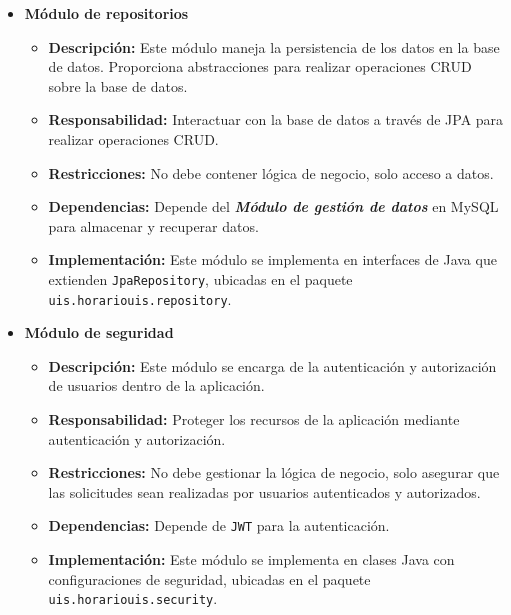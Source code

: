 \documentclass{article} %
\begin{document}
\begin{itemize}
\begin{itemize}
            \item \textbf{Módulo de repositorios}
            \begin{itemize}
                \item \textbf{Descripción:} Este módulo maneja la persistencia de los datos en la base de datos. Proporciona abstracciones para realizar operaciones CRUD sobre la base de datos.
                \item \textbf{Responsabilidad:} Interactuar con la base de datos a través de JPA para realizar operaciones CRUD.
                \item \textbf{Restricciones:} No debe contener lógica de negocio, solo acceso a datos.
                \item \textbf{Dependencias:} Depende del \textbf{\emph{Módulo de gestión de datos}} en MySQL para almacenar y recuperar datos.
                \item \textbf{Implementación:} Este módulo se implementa en interfaces de Java que extienden \texttt{JpaRepository}, ubicadas en el paquete \texttt{uis.horariouis.repository}.
            \end{itemize}
            
            \item \textbf{Módulo de seguridad}
            \begin{itemize}
                \item \textbf{Descripción:} Este módulo se encarga de la autenticación y autorización de usuarios dentro de la aplicación.
                \item \textbf{Responsabilidad:} Proteger los recursos de la aplicación mediante autenticación y autorización.
                \item \textbf{Restricciones:} No debe gestionar la lógica de negocio, solo asegurar que las solicitudes sean realizadas por usuarios autenticados y autorizados.
                \item \textbf{Dependencias:} Depende de \texttt{JWT} para la autenticación.
                \item \textbf{Implementación:} Este módulo se implementa en clases Java con configuraciones de seguridad, ubicadas en el paquete \texttt{uis.horariouis.security}.
            \end{itemize}
        \end{itemize}
        

\end{itemize}
\end{document}
